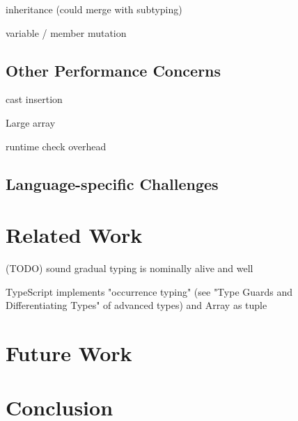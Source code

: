 inheritance (could merge with subtyping)

variable / member mutation

\section{Other Performance Concerns}

cast insertion

Large array

runtime check overhead

\section{Language-specific Challenges}

\renewcommand{\thechapter}{4}
\chapter{Related Work}

(TODO) sound gradual typing is nominally alive and well


TypeScript implements "occurrence typing" (see "Type Guards and Differentiating Types" of advanced types) and Array as tuple 
\renewcommand{\thechapter}{5}

\chapter{Future Work}

\renewcommand{\thechapter}{6}
\chapter{Conclusion}
